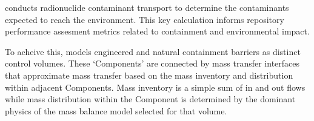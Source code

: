 \Cyder conducts radionuclide contaminant transport to determine the 
contaminants expected to reach the environment. This key calculation 
informs repository performance assesment metrics related to containment and 
environmental impact.

To acheive this, \Cyder models engineered and natural 
containment barriers as distinct control volumes. These `Components' are 
connected by mass transfer interfaces that approximate mass transfer based on 
the mass inventory and distribution within adjacent Components. Mass inventory 
is a simple sum of in and out flows while mass distribution within the 
Component is determined by the dominant physics of the mass balance model selected 
for that volume.  

